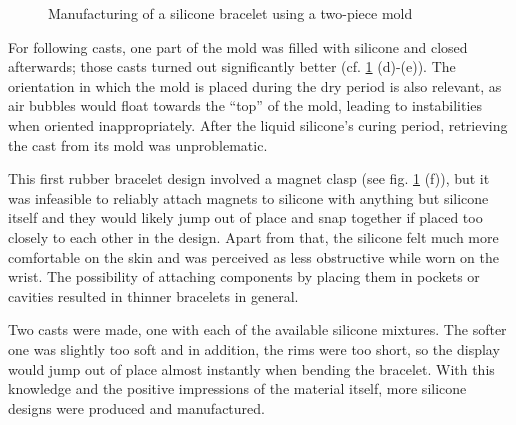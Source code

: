 \begin{figure}[bth]
	\caption{Manufacturing of a silicone bracelet using a two-piece mold}
	\label{fig:silicone01}
\end{figure}

For following casts, one part of the mold was filled with silicone and closed afterwards; those casts turned out significantly better (cf. \ref{fig:silicone01} (d)-(e)). The orientation in which the mold is placed during the dry period is also relevant, as air bubbles would float towards the ``top'' of the mold, leading to instabilities when oriented inappropriately. After the liquid silicone's curing period, retrieving the cast from its mold was unproblematic.

This first rubber bracelet design involved a magnet clasp (see fig. \ref{fig:silicone01} (f)), but it was infeasible to reliably attach magnets to silicone with anything but silicone itself and they would likely jump out of place and snap together if placed too closely to each other in the design. Apart from that, the silicone felt much more comfortable on the skin and was perceived as less obstructive while worn on the wrist. The possibility of attaching components by placing them in pockets or cavities resulted in thinner bracelets in general.

Two casts were made, one with each of the available silicone mixtures. The softer one was slightly too soft and in addition, the rims were too short, so the display would jump out of place almost instantly when bending the bracelet. With this knowledge and the positive impressions of the material itself, more silicone designs were produced and manufactured.

